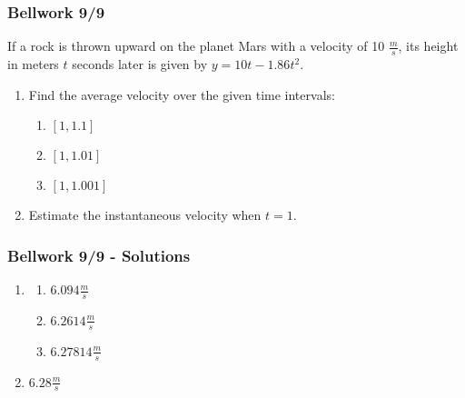 \documentclass[12pt]{beamer}
\begin{document}
\begin{frame}
	\frametitle{Bellwork 9/9}
	\vspace*{\fill}
	\initclock
	If a rock is thrown upward on the planet Mars with a velocity of 10 $\tfrac{m}{s}$, its height in meters $t$ seconds later is given by $y=10t-1.86t^2$.
	\vspace*{\fill}
	\vspace*{\fill}
	\begin{enumerate}
		\item Find the average velocity over the given time intervals:
		      \begin{multicols}{3}
			      \begin{enumerate}
				      \item $[1, 1.1]$
				      \item $[1, 1.01]$
				      \item $[1, 1.001]$
			      \end{enumerate}
		      \end{multicols}
		      \vspace*{\fill}
		\item Estimate the instantaneous velocity when $t=1$.
	\end{enumerate}
	\vspace*{\fill}
	\vspace*{\fill}
	\vspace*{\fill}
	\vspace*{\fill}
	\crono
\end{frame}
\begin{frame}
	\frametitle{Bellwork 9/9 - Solutions}
	\vspace*{\fill}
	\vspace*{\fill}
	\begin{enumerate}
		\item
		      \begin{multicols}{3}
			      \begin{enumerate}
				      \item $6.094\tfrac{m}{s}$
				      \item $6.2614\tfrac{m}{s}$
				      \item $6.27814\tfrac{m}{s}$
			      \end{enumerate}
		      \end{multicols}
		      \vspace*{\fill}
		\item $6.28\tfrac{m}{s}$
	\end{enumerate}
	\vspace*{\fill}
	\vspace*{\fill}
	\vspace*{\fill}
	\vspace*{\fill}
\end{frame}
\end{document}

